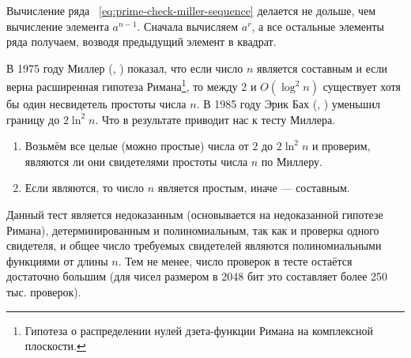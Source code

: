 Вычисление ряда ~\ref{eq:prime-check-miller-sequence} делается не дольше, чем вычисление элемента $a^{n-1}$. Сначала вычисляем $a^{r}$, а все остальные элементы ряда получаем, возводя предыдущий элемент в квадрат.

В 1975 году Миллер (, \cite{Miller:1975, Miller:1976}) показал, что если число $n$ является составным и если верна расширенная гипотеза Римана\footnote{Гипотеза о распределении нулей дзета-функции Римана на комплексной плоскости.}, то между 2 и $O \left( \log^2 n \right)$ существует хотя бы один несвидетель простоты числа $n$. В 1985 году Эрик Бах (, \cite{Bach:1990}) уменьшил границу до $2 \ln^2 n$. Что в результате приводит нас к тесту Миллера.

\begin{enumerate}
	\item Возьмём все целые (можно простые) числа от $2$ до $2 \ln^2 n $ и проверим, являются ли они свидетелями простоты числа $n$ по Миллеру.
	\item Если являются, то число $n$ является простым, иначе --- составным.
\end{enumerate}

Данный тест является недоказанным (основывается на недоказанной гипотезе Римана), детерминированным и полиномиальным, так как и проверка одного свидетеля, и общее число требуемых свидетелей являются полиномиальными функциями от длины $n$. Тем не менее, число проверок в тесте остаётся достаточно большим (для чисел размером в 2048 бит это составляет более 250 тыс. проверок).
